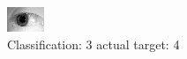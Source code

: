 \begin{figure}[h!]
\begin{center}
\includegraphics[width=0.60\columnwidth]{figures/ID1221_class_3_target_4.png}
\end{center}
\caption{ Classification: 3 actual target: 4}
\label{fig:ID1221_class_3_target_4}
\end{figure}
